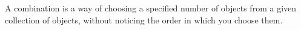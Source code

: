 A combination is a way of choosing a specified number of 
objects from a given collection of objects, without noticing
the order in which you choose them.